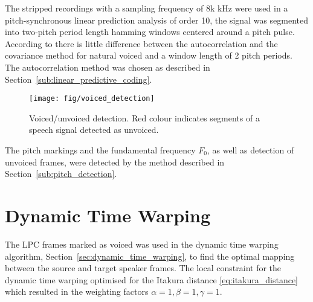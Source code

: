 The stripped recordings with a sampling frequency of 8k kHz were used in a pitch-synchronous linear prediction analysis of order 10, \ie the signal was segmented into two-pitch period length hamming windows centered around a pitch pulse. According to \cite{chandra74} there is little difference between the autocorrelation and the covariance method for natural voiced and a window length of 2 pitch periods. The autocorrelation method was chosen as described in Section~\ref{sub:linear_predictive_coding}. 
\begin{figure}[htbp]
	\begin{center}
		\texttt{[image: fig/voiced\_detection]}
		\caption{Voiced/unvoiced detection. Red colour indicates segments of a speech signal detected as unvoiced.}
		\label{fig:voiced_detection}
	\end{center}
\end{figure}
The pitch markings and the fundamental frequency $F_0$, as well as detection of unvoiced frames, were detected by the method described in Section~\ref{sub:pitch_detection}. 


\section{Dynamic Time Warping} %
\label{imp:dynamic_time_warping}
The LPC frames marked as voiced was used in the dynamic time warping algorithm, Section~\ref{sec:dynamic_time_warping}, to find the optimal mapping between the source and target speaker frames. The local constraint for the dynamic time warping optimised for the Itakura distance \eqref{eq:itakura_distance} which resulted in the weighting factors $\alpha=1, \beta=1, \gamma=1$.

